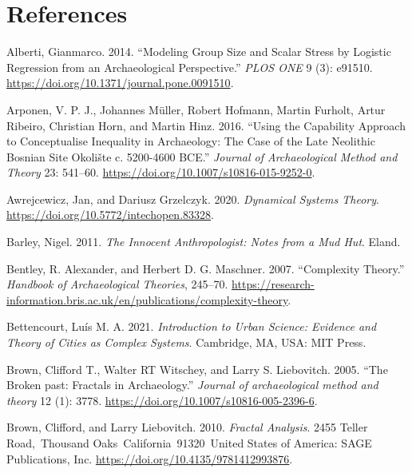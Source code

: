 \documentclass[
  12pt,
]{book}
\newlength{\cslhangindent}
\newlength{\cslentryspacingunit} %
\newenvironment{CSLReferences}[2] %
 {%
  \setlength{\parindent}{0pt}
  \ifodd #1
  \let\oldpar\par
  \def\par{\hangindent=\cslhangindent\oldpar}
  \fi
  \setlength{\parskip}{#2\cslentryspacingunit}
 }%
 {}
\begin{document}
\hypertarget{refs}{}
\begin{CSLReferences}{1}{0}
\hypertarget{references}{%
\chapter*{References}\label{references}}

\leavevmode{}%
Alberti, Gianmarco. 2014. {``Modeling Group Size and Scalar Stress by Logistic Regression from an Archaeological Perspective.''} \emph{PLOS ONE} 9 (3): e91510. \url{https://doi.org/10.1371/journal.pone.0091510}.

\leavevmode{}%
Arponen, V. P. J., Johannes Müller, Robert Hofmann, Martin Furholt, Artur Ribeiro, Christian Horn, and Martin Hinz. 2016. {``Using the Capability Approach to Conceptualise Inequality in Archaeology: The Case of the Late Neolithic Bosnian Site Okoli{š}te c. 5200-4600 BCE.''} \emph{Journal of Archaeological Method and Theory} 23: 541--60. \url{https://doi.org/10.1007/s10816-015-9252-0}.

\leavevmode{}%
Awrejcewicz, Jan, and Dariusz Grzelczyk. 2020. \emph{Dynamical Systems Theory}. \url{https://doi.org/10.5772/intechopen.83328}.

\leavevmode{}%
Barley, Nigel. 2011. \emph{The Innocent Anthropologist: Notes from a Mud Hut}. Eland.

\leavevmode{}%
Bentley, R. Alexander, and Herbert D. G. Maschner. 2007. {``Complexity Theory.''} \emph{Handbook of Archaeological Theories}, 245--70. \url{https://research-information.bris.ac.uk/en/publications/complexity-theory}.

\leavevmode{}%
Bettencourt, Luís M. A. 2021. \emph{Introduction to Urban Science: Evidence and Theory of Cities as Complex Systems}. Cambridge, MA, USA: MIT Press.

\leavevmode{}%
Brown, Clifford T., Walter RT Witschey, and Larry S. Liebovitch. 2005. {``The Broken past: Fractals in Archaeology.''} \emph{Journal of archaeological method and theory} 12 (1): 3778. \url{https://doi.org/10.1007/s10816-005-2396-6}.

\leavevmode{}%
Brown, Clifford, and Larry Liebovitch. 2010. \emph{Fractal Analysis}. 2455 Teller Road,~Thousand Oaks~California~91320~United States of America: SAGE Publications, Inc. \url{https://doi.org/10.4135/9781412993876}.


\end{CSLReferences}
\end{document}
